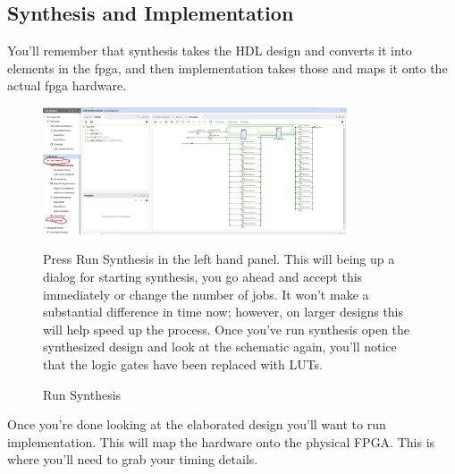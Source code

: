 \subsection{Synthesis and Implementation}
You'll remember that synthesis takes the HDL design and converts it into elements in the fpga, and then implementation takes those and maps it onto the actual fpga hardware.
\vspace{0.5cm}
\begin{figure}[H]
    \centering
    \includegraphics[width=9cm]{Images/CreateProjectImages/SynthesizeYourDesign.jpg}
    \caption{Run Synthesis}
    \label{fig:enter-label}
    \raggedright
    \vspace{0.5cm}
    Press Run Synthesis in the left hand panel. This will being up a dialog for starting synthesis, you go ahead and accept this immediately or change the number of jobs. It won't make a substantial difference in time now; however, on larger designs this will help speed up the process. Once you've run synthesis open the synthesized design and look at the schematic again, you'll notice that the logic gates have been replaced with LUTs.
\end{figure}

Once you're done looking at the elaborated design you'll want to run implementation. This will map the hardware onto the physical FPGA. This is where you'll need to grab your timing details.\\